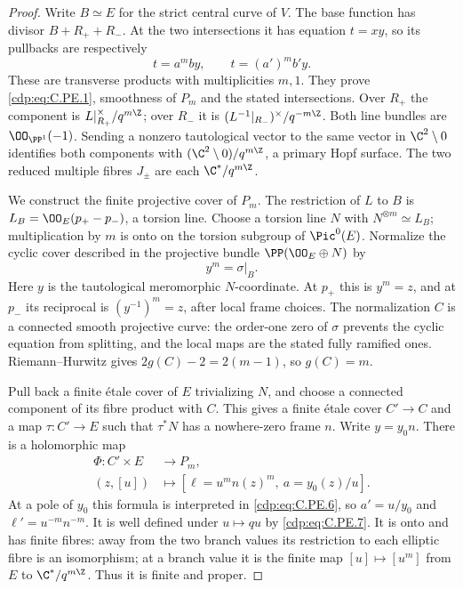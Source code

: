 \begin{proof}
Write $B\simeq E$ for the strict central curve of $V$.
The base function has divisor $B+R_++R_-$. At the two
intersections it has equation $t=xy$, so its pullbacks
are respectively
\[
                   t=a^mby,\qquad t=(a')^m b'y.         \tag{C.PE.10}\label{cdp:eq:C.PE.10}
\]
These are transverse products with multiplicities
$m,1$. They prove \eqref{cdp:eq:C.PE.1}, smoothness of $P_m$ and
the stated intersections. Over $R_+$ the component is
$L|_{R_+}^{\times}/q^{m\Z}$; over $R_-$ it is
$(L^{-1}|_{R_-})^{\times}/q^{-m\Z}$. Both line bundles
are $\OO_{\PP^1}(-1)$. Sending a nonzero tautological
vector to the same vector in $\C^2\setminus0$ identifies
both components with
$(\C^2\setminus0)/q^{m\Z}$, a primary Hopf surface.
The two reduced multiple fibres $J_\pm$ are each
$\C^*/q^{m\Z}$.

We construct the finite projective cover of $P_m$.
The restriction of $L$ to $B$ is
$L_B=\OO_E(p_+-p_-)$, a torsion line. Choose a torsion
line $N$ with $N^{\otimes m}\simeq L_B$; multiplication
by $m$ is onto on the torsion subgroup of $\Pic^0(E)$.
Normalize the cyclic cover described in the projective
bundle $\PP(\OO_E\oplus N)$ by
\[
                             y^m=\sigma|_B.              \tag{C.PE.11}\label{cdp:eq:C.PE.11}
\]
Here $y$ is the tautological meromorphic $N$-coordinate.
At $p_+$ this is $y^m=z$, and at $p_-$ its reciprocal
is $(y^{-1})^m=z$, after local frame choices. The
normalization $C$ is a connected smooth projective
curve: the order-one zero of $\sigma$ prevents the
cyclic equation from splitting, and the local maps
are the stated fully ramified ones. Riemann--Hurwitz
gives $2g(C)-2=2(m-1)$, so $g(C)=m$.

Pull back a finite \'etale cover of $E$ trivializing
$N$, and choose a connected component of its fibre
product with $C$. This gives a finite \'etale cover
$C'\to C$ and a map $\tau:C'\to E$ such that
$\tau^*N$ has a nowhere-zero frame $n$. Write
$y=y_0n$. There is a holomorphic map
\[
 \begin{split}
 \Phi:C'\times E&\longrightarrow P_m,\\
 (z,[u])&\longmapsto
       [\ell=u^m n(z)^m,\ a=y_0(z)/u].
 \end{split}                                             \tag{C.PE.12}\label{cdp:eq:C.PE.12}
\]
At a pole of $y_0$ this formula is interpreted in
\eqref{cdp:eq:C.PE.6}, so $a'=u/y_0$ and $\ell'=u^{-m}n^{-m}$.
It is well defined under $u\mapsto qu$ by \eqref{cdp:eq:C.PE.7}.
It is onto and has finite fibres: away from the two
branch values its restriction to each elliptic fibre
is an isomorphism; at a branch value it is the finite
map $[u]\mapsto[u^m]$ from $E$ to
$\C^*/q^{m\Z}$. Thus it is finite and proper.


\end{proof}
